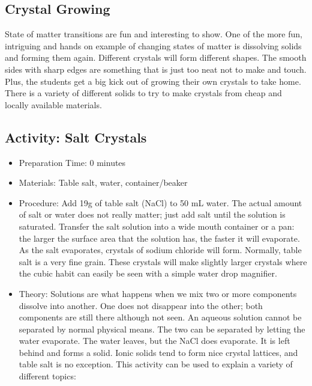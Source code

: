 \begin{itemize}
{\begin{itemize}
\section{Crystal Growing}

State of matter transitions are fun and interesting to show. One of the more fun, intriguing and hands on example of changing states of matter is dissolving solids and forming them again. Different crystals will form different shapes. The smooth sides with sharp edges are something that is just too neat not to make and touch. Plus, the students get a big kick out of growing their own crystals to take home. There is a variety of different solids to try to make crystals from cheap and locally available materials.

\subsection{Activity: Salt Crystals}
\begin{itemize}
\item{Preparation Time: 0 minutes}
\item{Materials: Table salt, water, container/beaker}
\item{Procedure: Add 19g of table salt (NaCl) to 50 mL water. The actual amount of salt or water does not really matter; just add salt until the solution is saturated. Transfer the salt solution into a wide mouth container or a pan: the larger the surface area that the solution has, the faster it will evaporate. As the salt evaporates, crystals of sodium chloride will form. Normally, table salt is a very fine grain. These crystals will make slightly larger crystals where the cubic habit can easily be seen with a simple water drop magnifier.}
\item{Theory: Solutions are what happens when we mix two or more components dissolve into another. One does not disappear into the other; both components are still there although not seen. An aqueous solution cannot be separated by normal physical means. The two can be separated by letting the water evaporate. The water leaves, but the NaCl does evaporate. It is left behind and forms a solid. Ionic solids tend to form nice crystal lattices, and table salt is no exception. This activity can be used to explain a variety of different topics:
\begin{itemize}

\end{itemize}}
\end{itemize}
\end{itemize}}
\end{itemize}
